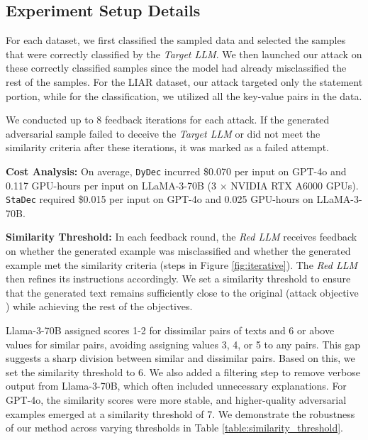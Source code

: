 \documentclass[11pt]{article}
\newcommand \dydec[0]{\texttt{DyDec}}
\newcommand \stadec[0]{\texttt{StaDec}}
\newcommand \redLLM[0]{\textsl{Red LLM}}
\begin{document}
\subsection{Experiment Setup Details}
\label{subsec:Experimental_details}
For each dataset, we first classified the sampled data and selected the samples that were correctly classified by the \textsl{Target LLM}. We then launched our attack on these correctly classified samples since the model had already misclassified the rest of the samples. For the LIAR dataset, our attack targeted only the statement portion, while for the classification, we utilized all the key-value pairs in the data.

We conducted up to 8 feedback iterations for each attack. If the generated adversarial sample failed to deceive the \textsl{Target LLM} or did not meet the similarity criteria after these iterations, it was marked as a failed attempt.

\vspace{0.05cm}
\noindent \textbf{Cost Analysis:}
On average, \dydec{} incurred \$0.070 per input on GPT-4o and 0.117 GPU-hours per input on LLaMA-3-70B (3 × NVIDIA RTX A6000 GPUs). \stadec{} required \$0.015 per input on GPT-4o and 0.025 GPU-hours on LLaMA-3-70B.

\vspace{0.05cm}
\noindent \textbf{Similarity Threshold:} In each feedback round, the \redLLM{} receives feedback on whether the generated example was misclassified and whether the generated example met the similarity criteria (steps  in Figure \ref{fig:iterative}). The \redLLM{} then refines its instructions accordingly. We set a similarity threshold to ensure that the generated text remains sufficiently close to the original (attack objective ) while achieving the rest of the objectives.

Llama-3-70B assigned scores 1-2 for dissimilar pairs of texts and 6 or above values for similar pairs, avoiding assigning values 3, 4, or 5 to any pairs. This gap suggests a sharp division between similar and dissimilar pairs.
Based on this, we set the similarity threshold to 6. We also added a filtering step to remove verbose output from Llama-3-70B, which often included unnecessary explanations. For GPT-4o, the similarity scores were more stable, and higher-quality adversarial examples emerged at a similarity threshold of 7. We demonstrate the robustness of our method across varying thresholds in Table \ref{table:similarity_threshold}.
\end{document}
